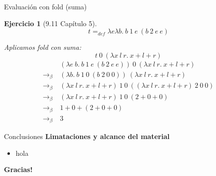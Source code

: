 \documentclass[11pt]{beamer}
\newtheorem{exercise}{Ejercicio}
\begin{document}
\begin{frame}{Evaluación con \textsf{fold} (suma)}
	\begin{exercise}[9.11 Capítulo 5]
		\[
		t =_{def} \lambda e\lambda b.\ b\ 1\ e\ (b\ 2\ e\ e)
		\]
		
		Aplicamos \textsf{fold} con suma:
		\[
		t\ 0\ (\lambda x\ l\ r.\ x + l + r)
		\]
		\begin{align*}
			&(\lambda e\ b.\ b\ 1\ e\ (b\ 2\ e\ e))\ 0\ (\lambda x\ l\ r.\ x + l + r) \\
			\rightarrow_\beta\ &(\lambda b.\ b\ 1\ 0\ (b\ 2\ 0\ 0))\ (\lambda x\ l\ r.\ x + l + r) \\
			\rightarrow_\beta\ &(\lambda x\ l\ r.\ x + l + r)\ 1\ 0\ ((\lambda x\ l\ r.\ x + l + r)\ 2\ 0\ 0) \\
			\rightarrow_\beta\ &(\lambda x\ l\ r.\ x + l + r)\ 1\ 0\ (2 + 0 + 0) \\
			\rightarrow_\beta\ &1 + 0 + (2 + 0 + 0) \\
			\rightarrow_\beta\ &3
		\end{align*}
	\end{exercise}
\end{frame}



\begin{frame}{Conclusiones}
	\textbf{Limataciones y alcance del material}
	\begin{itemize}
		\item{hola}
	\end{itemize}
\end{frame}

\begin{frame}
	\textbf{Gracias!}
\end{frame}
\end{document}
